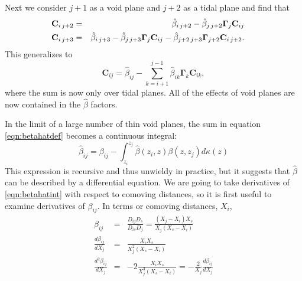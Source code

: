 \documentclass{emulateapj}
\newcommand\C[0]{\mathbf{C}}
\newcommand\GammaMat[0]{\boldsymbol{\Gamma}}
\newcommand\betahat{\hat{\beta}}
\begin{document}
Next we consider $j +1$ as a void plane and $j + 2$ as a tidal plane and find that
\begin{eqnarray}
\hspace*{-0.45cm}\C_{i \, j+2} &=& \betahat_{i \, j+2} - \betahat_{j \, j + 2} \GammaMat_j \C_{i j}\\
\hspace*{-0.45cm}\C_{i \, j+3} &=& \betahat_{i \, j+3} - \betahat_{j \, j + 3} \GammaMat_j \C_{i j} - \betahat_{j+2 \, j+3} \GammaMat_{j+2} \C_{i \, j+2}.
\end{eqnarray}
This generalizes to 
\begin{equation}
\C_{i j} = \betahat_{i j} - \sum\limits_{k = i +1}^{j - 1} \betahat_{i k} \GammaMat_k \C_{i k},
\end{equation}
where the sum is now only over tidal planes. All of the effects of void planes are now contained in the $\betahat$ factors.

In the limit of a large number of thin void planes, the sum in equation \ref{eqn:betahatdef} becomes a continuous integral:
\begin{equation}
\label{eqn:betahatint}
\betahat_{i j} = \beta_{ i j} - \int_{z_i}^{z_j} \betahat(z_i, z) \beta(z, z_j) d\kappa(z)
\end{equation}
This expression is recursive and thus unwieldy in practice, but it suggests that $\betahat$ can be described by a differential equation. We are going to take derivatives of \ref{eqn:betahatint} with respect to comoving distances, so it is first useful to examine derivatives of $\beta_{i j}$. In terms or comoving distances, $X_i$, 
\begin{eqnarray}
\beta_{i j} &=&\frac{D_{i j} D_s}{D_{i s} D_j} = \frac{(X_j - X_i) X_s}{X_j (X_s - X_i)} \\
\frac{d \beta_{i j}}{d X_j} &=& \frac{X_i X_s}{X_j^2 (X_s - X_i)}\\
\label{eqn:d2betahatdbetahat} 
\frac{d^2 \beta_{i j}}{d X_j} &=& -2 \frac{X_i X_s}{X_j^3 (X_s - X_i)} = -\frac{2}{X_j} \frac{d \beta_{i j}}{d X_j} 
\end{eqnarray}
\end{document}
